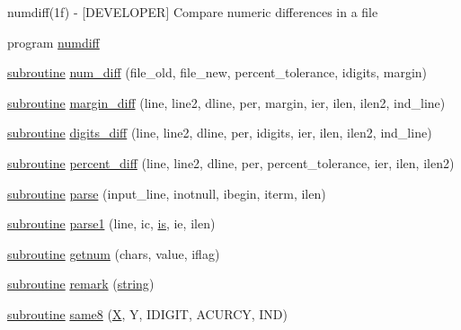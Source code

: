 \begin{DoxyCompactItemize}
\begin{DoxyCompactList}
numdiff(1f) -\/ \mbox{[}D\+E\+V\+E\+L\+O\+P\+ER\mbox{]} Compare numeric differences in a file \end{DoxyCompactList}\item 
program \hyperlink{numdiff_8f90_a5af23474c4d2e32d7426907cf2536366}{numdiff}
\item 
\hyperlink{M__stopwatch_83_8txt_acfbcff50169d691ff02d4a123ed70482}{subroutine} \hyperlink{numdiff_8f90_a5bf0d2166ed3d2cb137b6084621a231f}{num\+\_\+diff} (file\+\_\+old, file\+\_\+new, percent\+\_\+tolerance, idigits, margin)
\item 
\hyperlink{M__stopwatch_83_8txt_acfbcff50169d691ff02d4a123ed70482}{subroutine} \hyperlink{numdiff_8f90_a5d78de65cd7fa1c21f36db3018f1ffaf}{margin\+\_\+diff} (line, line2, dline, per, margin, ier, ilen, ilen2, ind\+\_\+line)
\item 
\hyperlink{M__stopwatch_83_8txt_acfbcff50169d691ff02d4a123ed70482}{subroutine} \hyperlink{numdiff_8f90_a52df4f6514ae8b40384687c5e7a94445}{digits\+\_\+diff} (line, line2, dline, per, idigits, ier, ilen, ilen2, ind\+\_\+line)
\item 
\hyperlink{M__stopwatch_83_8txt_acfbcff50169d691ff02d4a123ed70482}{subroutine} \hyperlink{numdiff_8f90_a3a10618690bb709040a044704b25ec7d}{percent\+\_\+diff} (line, line2, dline, per, percent\+\_\+tolerance, ier, ilen, ilen2)
\item 
\hyperlink{M__stopwatch_83_8txt_acfbcff50169d691ff02d4a123ed70482}{subroutine} \hyperlink{numdiff_8f90_a78c07a4665edf04b67eaeeb072b4e115}{parse} (input\+\_\+line, inotnull, ibegin, iterm, ilen)
\item 
\hyperlink{M__stopwatch_83_8txt_acfbcff50169d691ff02d4a123ed70482}{subroutine} \hyperlink{numdiff_8f90_aeee37c7b0374de09f2c99faac68f1bd5}{parse1} (line, ic, \hyperlink{intro__blas1_83_8txt_a42a91df93f840595de3019ceb5d1df23}{is}, ie, ilen)
\item 
\hyperlink{M__stopwatch_83_8txt_acfbcff50169d691ff02d4a123ed70482}{subroutine} \hyperlink{numdiff_8f90_aaeae7de323a14e4d927224585b530d90}{getnum} (chars, value, iflag)
\item 
\hyperlink{M__stopwatch_83_8txt_acfbcff50169d691ff02d4a123ed70482}{subroutine} \hyperlink{numdiff_8f90_ab59cb8434f0791b438eb140dd577e0cc}{remark} (\hyperlink{what__overview_81_8txt_a74cb7e955273b9f9157b4f0c18a38849}{string})
\item 
\hyperlink{M__stopwatch_83_8txt_acfbcff50169d691ff02d4a123ed70482}{subroutine} \hyperlink{numdiff_8f90_ad61224828d0e9d4b998278d50ab4842f}{same8} (\hyperlink{intro__blas1_83_8txt_ac8596739bc875e90fe6e2ecf98e87906}{X}, Y, I\+D\+I\+G\+IT, A\+C\+U\+R\+CY, I\+ND)
\end{DoxyCompactItemize}


